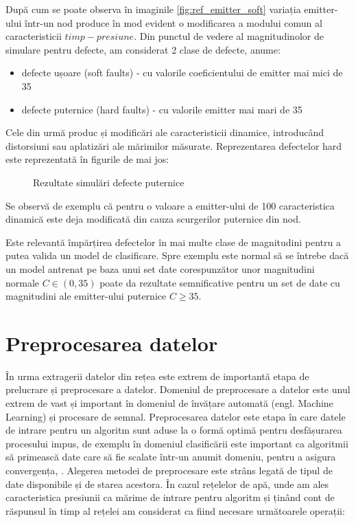 După cum se poate observa în imaginile \ref{fig:ref_emitter_soft} variația emitter-ului într-un nod produce în mod evident o modificarea a modului comun al caracteristicii $timp-presiune$. Din punctul de vedere al magnitudinolor de simulare pentru defecte, am considerat 2 clase de defecte, anume:
\begin{itemize}
\item defecte ușoare (soft faults) - cu valorile coeficientului de emitter mai mici de 35
\item defecte puternice (hard faults) - cu valorile emitter mai mari de 35 
\end{itemize}

Cele din urmă produc și modificări ale caracteristicii dinamice, introducând distorsiuni sau aplatizări ale mărimilor măsurate. Reprezentarea defectelor hard este reprezentată în figurile de mai jos:

\begin{figure}[H]

\qquad
{}
\caption{Rezultate simulări defecte puternice}
\label{fig:ref_emitter_hard}
\end{figure}

Se observă de exemplu că pentru o valoare a emitter-ului de 100 caracteristica dinamică este deja modificată din cauza scurgerilor puternice din nod. 

Este relevantă împărțirea defectelor în mai multe clase de magnitudini pentru a putea valida un model de clasificare. Spre exemplu este normal să se întrebe dacă un model antrenat pe baza unui set date corespunzător unor magnitudini normale $C \in (0, 35)$ poate da rezultate semnificative pentru un set de date cu magnitudini ale emitter-ului puternice $C \geqslant 35$. 

\section{Preprocesarea datelor}
\label{sec:preproc}
În urma extragerii datelor din rețea este extrem de importantă etapa de prelucrare și preprocesare a datelor. Domeniul de preprocesare a datelor este unul extrem de vast și important în domeniul de învățare automată (engl. Machine Learning) și procesare de semnal. Preprocesarea datelor este etapa în care datele de intrare pentru un algoritm sunt aduse la o formă optimă pentru desfășurarea procesului impus, de exemplu în domeniul clasificării este important ca algoritmii să primească date care să fie scalate într-un anumit domeniu, pentru a asigura convergența\cite{dataPreprocessing}, \cite{GIGO}. Alegerea metodei de preprocesare este strâns legată de tipul de date disponibile și de starea acestora. În cazul rețelelor de apă, unde am ales caracteristica presiunii ca mărime de intrare pentru algoritm și ținând cont de răspunsul în timp al rețelei am considerat ca fiind necesare următoarele operații:

